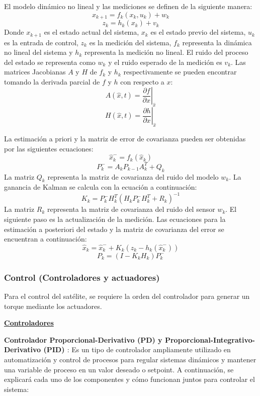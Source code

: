 El modelo dinámico no lineal y las mediciones se definen de la siguiente manera:
\[
x_{k+1} = f_k(x_k, u_k) + w_k
\]
\[
z_k = h_k(x_k) + v_k
\]
Donde $x_{k+1}$ es el estado actual del sistema, $x_k$ es el estado previo del sistema, $u_k$ es la entrada de control, $z_k$ es la medición del sistema, $f_k$ representa la dinámica no lineal del sistema y $h_k$ representa la medición no lineal. El ruido del proceso del estado se representa como $w_k$ y el ruido esperado de la medición es $v_k$. Las matrices Jacobianas $A$ y $H$ de $f_k$ y $h_k$ respectivamente se pueden encontrar tomando la derivada parcial de $f$ y $h$ con respecto a $x$:
\[
A(\hat{x}, t) = \left. \frac{\partial f}{\partial x} \right|_{\hat{x}} 
\]
\[
H(\hat{x}, t) = \left. \frac{\partial h}{\partial x} \right|_{\hat{x}} 
\]

La estimación a priori y la matriz de error de covarianza pueden ser obtenidas por las siguientes ecuaciones:
\[
\hat{x}_k^- = f_k(\hat{x}_k)
\]
\[
P_k^- = A_k P_{k-1} A_k^T + Q_k
\]
La matriz $Q_k$ representa la matriz de covarianza del ruido del modelo $w_k$. La ganancia de Kalman se calcula con la ecuación a continuación:
\[
K_k = P_k^- H_k^T \left( H_k P_k^- H_k^T + R_k \right)^{-1}
\]
La matriz $R_k$ representa la matriz de covarianza del ruido del sensor $w_k$. El siguiente paso es la actualización de la medición. Las ecuaciones para la estimación a posteriori del estado y la matriz de covarianza del error se encuentran a continuación:
\[
\hat{x}_k = \hat{x}_k^- + K_k \left( z_k - h_k(\hat{x}_k^-) \right)
\]
\[
P_k = \left( I - K_k H_k \right) P_k^-
\]

\subsubsection{Control (Controladores y actuadores)}

Para el control del satélite, se requiere la orden del controlador para generar un torque mediante los actuadores.

\textbf{\underline{Controladores}}

\textbf{Controlador Proporcional-Derivativo (PD) y Proporcional-Integrativo-Derivativo (PID) \cite{ref23}}: Es un tipo de controlador ampliamente utilizado en automatización y control de procesos para regular sistemas dinámicos y mantener una variable de proceso en un valor deseado o setpoint. A continuación, se explicará cada uno de los componentes y cómo funcionan juntos para controlar el sistema:

